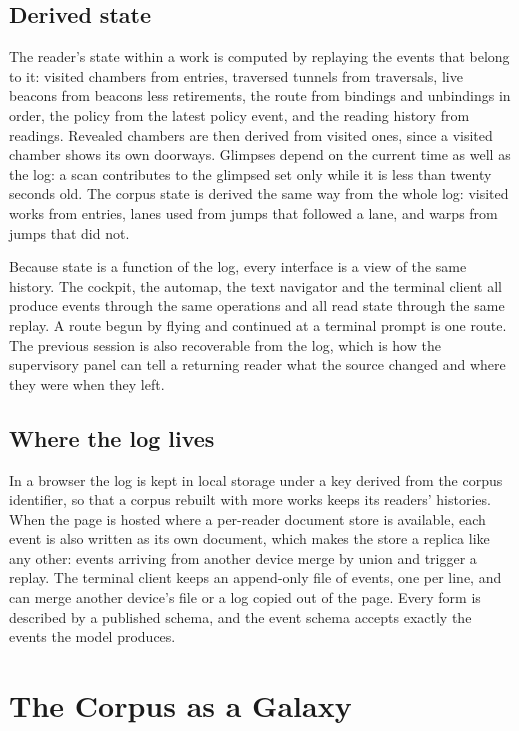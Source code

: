 \documentclass[11pt]{article}
\theoremstyle{remark}
\begin{document}
\subsection{Derived state}

The reader's state within a work is computed by replaying the events that belong to it: visited chambers from entries, traversed tunnels from traversals, live beacons from beacons less retirements, the route from bindings and unbindings in order, the policy from the latest policy event, and the reading history from readings. Revealed chambers are then derived from visited ones, since a visited chamber shows its own doorways. Glimpses depend on the current time as well as the log: a scan contributes to the glimpsed set only while it is less than twenty seconds old. The corpus state is derived the same way from the whole log: visited works from entries, lanes used from jumps that followed a lane, and warps from jumps that did not.

Because state is a function of the log, every interface is a view of the same history. The cockpit, the automap, the text navigator and the terminal client all produce events through the same operations and all read state through the same replay. A route begun by flying and continued at a terminal prompt is one route. The previous session is also recoverable from the log, which is how the supervisory panel can tell a returning reader what the source changed and where they were when they left.

\subsection{Where the log lives}

In a browser the log is kept in local storage under a key derived from the corpus identifier, so that a corpus rebuilt with more works keeps its readers' histories. When the page is hosted where a per-reader document store is available, each event is also written as its own document, which makes the store a replica like any other: events arriving from another device merge by union and trigger a replay. The terminal client keeps an append-only file of events, one per line, and can merge another device's file or a log copied out of the page. Every form is described by a published schema, and the event schema accepts exactly the events the model produces.

\section{The Corpus as a Galaxy}
\label{sec:corpus}
\end{document}
